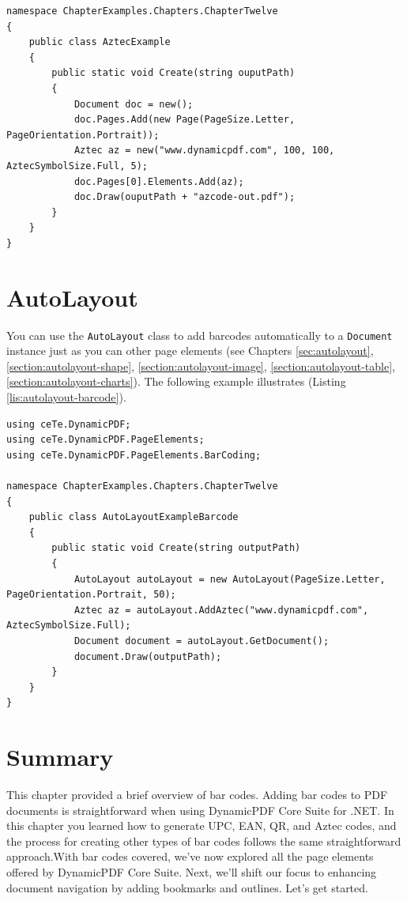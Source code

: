 \documentclass[american,letterpaper]{tufte-book}
\numberwithin{equation}{section}
\numberwithin{figure}{section}
\begin{document}
{\begin{lstlisting}[caption={Adding an Aztec code to a PDF document.},label={lis:Adding-an-Aztec},basicstyle={\small\ttfamily},breaklines=true]
namespace ChapterExamples.Chapters.ChapterTwelve
{
    public class AztecExample
    {
        public static void Create(string ouputPath)
        {
            Document doc = new();
            doc.Pages.Add(new Page(PageSize.Letter, PageOrientation.Portrait));
            Aztec az = new("www.dynamicpdf.com", 100, 100, AztecSymbolSize.Full, 5);
            doc.Pages[0].Elements.Add(az);
            doc.Draw(ouputPath + "azcode-out.pdf");
        }
    }
}
\end{lstlisting}
\leavevmode\egroup

\section{AutoLayout}
\label{section:autolayout-barcode}
You can use the \texttt{AutoLayout} class to add barcodes automatically to a \texttt{Document} instance just as you can other page elements (see Chapters \ref{sec:autolayout}, \ref{section:autolayout-shape}, \ref{section:autolayout-image}, \ref{section:autolayout-table}, \ref{section:autolayout-charts}). The following example illustrates (Listing \ref{lis:autolayout-barcode}).

\bgroup{}
\begin{lstlisting}[caption={Using AutoLayout to create a PDF document.},label={lis:autolayout-barcode},basicstyle={\small\ttfamily},breaklines=true]
using ceTe.DynamicPDF;
using ceTe.DynamicPDF.PageElements;
using ceTe.DynamicPDF.PageElements.BarCoding;

namespace ChapterExamples.Chapters.ChapterTwelve
{
    public class AutoLayoutExampleBarcode
    {
        public static void Create(string outputPath)
        {
            AutoLayout autoLayout = new AutoLayout(PageSize.Letter, PageOrientation.Portrait, 50);
            Aztec az = autoLayout.AddAztec("www.dynamicpdf.com", AztecSymbolSize.Full);
            Document document = autoLayout.GetDocument();
            document.Draw(outputPath);
        }
    }
}
\end{lstlisting}
\leavevmode\egroup

\section{Summary}

This chapter provided a brief overview of bar codes. Adding bar codes to PDF documents is straightforward when using DynamicPDF Core Suite for .NET. In this chapter you learned how to generate UPC, EAN, QR, and Aztec codes, and the process for creating other types of bar codes follows the same straightforward approach.With bar codes covered, we've now explored all the page elements offered by DynamicPDF Core Suite. Next, we’ll shift our focus to enhancing document navigation by adding bookmarks and outlines. Let’s get started.

}
\end{document}
